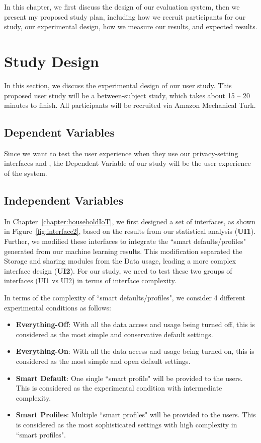 In this chapter, we first discuss the design of our evaluation system, then we present my proposed study plan, including how we recruit participants for our study, our experimental design, how we measure our results, and expected results.

\section{Study Design}


In this section, we discuss the experimental design of our user study. This proposed user study will be a between-subject study, which takes about 15 -- 20 minutes to finish. All participants will be recruited via Amazon Mechanical Turk.

\subsection{Dependent Variables}
Since we want to test the user experience when they use our privacy-setting interfaces and , the Dependent Variable of our study will be the user experience of the system. 

\subsection{Independent Variables}
In Chapter~\ref{chapter:householdIoT},  we first designed a set of interfaces, as shown in Figure~\ref{fig:interface2}, based on the results from our statistical analysis (\textbf{UI1}). Further, we modified these interfaces to integrate the ``smart defaults/profiles" generated from our machine learning results. This modification separated the Storage and sharing modules from the Data usage, leading a more complex interface design (\textbf{UI2}). For our study, we need to test these two groups of interfaces (UI1 vs UI2) in terms of interface complexity.

In terms of the complexity of ``smart defaults/profiles", we consider 4 different experimental conditions as follows:
\begin{itemize}
	\item \textbf{Everything-Off}: With all the data access and usage being turned off, this is considered as the most simple and conservative default settings.
	\item \textbf{Everything-On}: With all the data access and usage being turned on, this is considered as the most simple and open default settings.
	\item \textbf{Smart Default}: One single ``smart profile" will be provided to the users. This is considered as the experimental condition with intermediate complexity.
	\item \textbf{Smart Profiles}: Multiple ``smart profiles" will be provided to the users. This is considered as the most sophisticated settings with high complexity in ``smart profiles".
\end{itemize}

